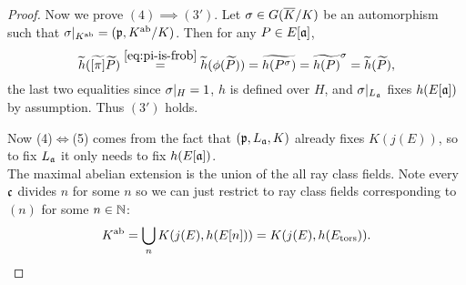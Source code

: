\begin{proof}
Now we prove $(4)\implies(3')$. Let $\sigma\in G(\overline{K}/K)$ be an automorphism such that $\sigma|_{K^{\text{ab}}}=(\mathfrak{p},K^{\text{ab}}/K)$. Then for any $P\in E[\mathfrak{a}]$,
\[
\widetilde{h}(\widetilde{[\pi]}\widetilde{P})\stackrel{\eqref{eq:pi-is-frob}}{=}\widetilde{h}(\phi(\widetilde{P}))=\widetilde{h(P^{\sigma})}=\widetilde{h(P)}^{\sigma}=\widetilde{h}(\widetilde{P}),
\]
the last two equalities since $\sigma|_H=1$, $h$ is defined over $H$, and $\sigma|_{L_{\mathfrak{a}}}$ fixes $h(E[\mathfrak{a}])$ by assumption. Thus $(3')$ holds. %

Now (4)$\iff$(5) comes from the fact that $(\mathfrak{p},L_{\mathfrak{a}},K)$ already fixes $K(j(E))$, so to fix $L_{\mathfrak{a}}$ it only needs to fix $h(E[\mathfrak{a}])$.\\
%
%
%
%

The maximal abelian extension is the union of the all ray class fields. Note every $\mathfrak{c}$ divides $n$ for some $n$ so we can just restrict to ray class fields corresponding to $(n)$ for some $n\in \mathbb{N}$:
\[
K^{\text{ab}}=\bigcup_{n}K(j(E),h(E[n]))=K(j(E),h(E_{\text{tors}})).
\]
\end{proof}
